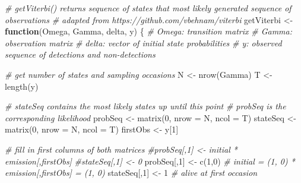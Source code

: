 \documentclass[
  12pt,
]{krantz}
\newenvironment{Shaded}{\begin{snugshade}}{\end{snugshade}}
\newcommand{\AttributeTok}[1]{\textcolor[rgb]{0.77,0.63,0.00}{#1}}
\newcommand{\CommentTok}[1]{\textcolor[rgb]{0.56,0.35,0.01}{\textit{#1}}}
\newcommand{\ControlFlowTok}[1]{\textcolor[rgb]{0.13,0.29,0.53}{\textbf{#1}}}
\newcommand{\DecValTok}[1]{\textcolor[rgb]{0.00,0.00,0.81}{#1}}
\newcommand{\FunctionTok}[1]{\textcolor[rgb]{0.00,0.00,0.00}{#1}}
\newcommand{\NormalTok}[1]{#1}
\newcommand{\OtherTok}[1]{\textcolor[rgb]{0.56,0.35,0.01}{#1}}
\begin{document}
\begin{Shaded}
\begin{Highlighting}[]
\CommentTok{\# getViterbi() returns sequence of states that most likely generated sequence of observations}
\CommentTok{\# adapted from https://github.com/vbehnam/viterbi}
\NormalTok{getViterbi }\OtherTok{\textless{}{-}} \ControlFlowTok{function}\NormalTok{(Omega, Gamma, delta, y) \{}
\CommentTok{\# Omega: transition matrix}
\CommentTok{\# Gamma: observation matrix}
\CommentTok{\# delta: vector of initial state probabilities}
\CommentTok{\# y: observed sequence of detections and non{-}detections}
  
\CommentTok{\# get number of states and sampling occasions}
\NormalTok{N }\OtherTok{\textless{}{-}} \FunctionTok{nrow}\NormalTok{(Gamma)}
\NormalTok{T }\OtherTok{\textless{}{-}} \FunctionTok{length}\NormalTok{(y)}
  
\CommentTok{\# stateSeq contains the most likely states up until this point}
\CommentTok{\# probSeq is the corresponding likelihood}
\NormalTok{probSeq }\OtherTok{\textless{}{-}} \FunctionTok{matrix}\NormalTok{(}\DecValTok{0}\NormalTok{, }\AttributeTok{nrow =}\NormalTok{ N, }\AttributeTok{ncol =}\NormalTok{ T)}
\NormalTok{stateSeq }\OtherTok{\textless{}{-}} \FunctionTok{matrix}\NormalTok{(}\DecValTok{0}\NormalTok{, }\AttributeTok{nrow =}\NormalTok{ N, }\AttributeTok{ncol =}\NormalTok{ T)}
\NormalTok{firstObs }\OtherTok{\textless{}{-}}\NormalTok{ y[}\DecValTok{1}\NormalTok{]}
  
\CommentTok{\# fill in first columns of both matrices}
\CommentTok{\#probSeq[,1] \textless{}{-} initial * emission[,firstObs]}
\CommentTok{\#stateSeq[,1] \textless{}{-} 0}
\NormalTok{probSeq[,}\DecValTok{1}\NormalTok{] }\OtherTok{\textless{}{-}} \FunctionTok{c}\NormalTok{(}\DecValTok{1}\NormalTok{,}\DecValTok{0}\NormalTok{) }\CommentTok{\# initial = (1, 0) * emission[,firstObs] = (1, 0)}
\NormalTok{stateSeq[,}\DecValTok{1}\NormalTok{] }\OtherTok{\textless{}{-}} \DecValTok{1} \CommentTok{\# alive at first occasion}


\end{Highlighting}
\end{Shaded}
\end{document}
